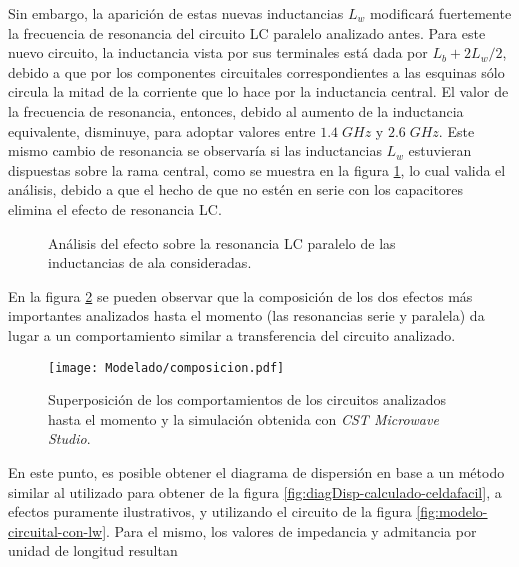 Sin embargo, la aparición de estas nuevas inductancias $L_{w}$ modificará fuertemente la frecuencia de resonancia del circuito LC paralelo analizado antes. Para este nuevo circuito, la inductancia vista por sus terminales está dada por $L_{b}+2 L_{w}/2$, debido a que por los componentes circuitales correspondientes a las esquinas sólo circula la mitad de la corriente que lo hace por la inductancia central. El valor de la frecuencia de resonancia, entonces, debido al aumento de la inductancia equivalente, disminuye, para adoptar valores entre $1.4\;GHz$ y $2.6\;GHz$. Este mismo cambio de resonancia se observaría si las inductancias $L_w$ estuvieran dispuestas sobre la rama central, como se muestra en la figura \ref{fig:res-serie-p21p22}, lo cual valida el análisis, debido a que el hecho de que no estén en serie con los capacitores elimina el efecto de resonancia LC.

\begin{figure}[H]
	\centering 
	\hspace{0pt}
	\caption{Análisis del efecto sobre la resonancia LC paralelo de las inductancias de ala consideradas.}
	\label{fig:res-serie-p21p22}
\end{figure}

En la figura \ref{fig:modelo-circuital-resonancia-serie-graficos} se pueden observar que la composición de los dos efectos más importantes analizados hasta el momento (las resonancias serie y paralela) da lugar a un comportamiento similar a transferencia del circuito analizado.

\begin{figure}[h]
	\centering
	\texttt{[image: Modelado/composicion.pdf]}
	\caption{Superposición de los comportamientos de los circuitos analizados hasta el momento y la simulación obtenida con \textit{CST Microwave Studio}.}
	\label{fig:modelo-circuital-resonancia-serie-graficos}
\end{figure}

En este punto, es posible obtener el diagrama de dispersión en base a un método similar al utilizado para obtener de la figura \ref{fig:diagDisp-calculado-celdafacil}, a efectos puramente ilustrativos, y utilizando el circuito de la figura \ref{fig:modelo-circuital-con-lw}. Para el mismo, los valores de impedancia y admitancia por unidad de longitud resultan


